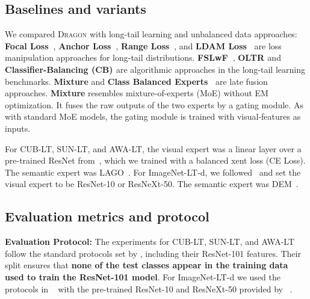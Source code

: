 \documentclass[10pt,twocolumn,letterpaper]{article}
\newcommand{\DRAGON}{\textsc{Dragon}}
\begin{document}
\subsection{Baselines and variants}
We compared \DRAGON{} with long-tail learning and unbalanced data approaches: 
\textbf{Focal Loss~\cite{Lin2017FocalLF}}, \textbf{Anchor Loss~\cite{Ryou_2019_ICCV}},
\textbf{Range Loss~\cite{Zhang2017RangeLF}}, and \textbf{LDAM Loss~\cite{cao2019learning}} are loss manipulation approaches for long-tail distributions.
\textbf{FSLwF~\cite{Gidaris2018DynamicFV}}, \textbf{OLTR \cite{openlongtailrecognition}} and \textbf{Classifier-Balancing (CB) \cite{Kang2019DecouplingRA}} are algorithmic approaches in the long-tail learning benchmarks.
\textbf{Mixture} and \textbf{Class Balanced Experts~\cite{sharma2020long}} are late fusion approaches.
\textbf{Mixture} resembles mixture-of-experts (MoE) \cite{MoE_hinton} without EM optimization. It fuses the raw outputs of the two experts by a gating module. As with standard MoE models, the gating module is trained with visual-features as inputs.

For CUB-LT, SUN-LT, and AWA-LT, the visual expert was a linear layer over a pre-trained ResNet from~\cite{xianCVPR,xian_awa2}, which we trained with a balanced xent loss (CE Loss). The semantic expert was LAGO~\cite{LAGO}. For ImageNet-LT-d, we followed~\cite{Kang2019DecouplingRA} and set the visual expert to be ResNet-10 or ResNeXt-50. The semantic expert was DEM~\cite{DEM}.

\subsection{Evaluation metrics and protocol}

\textbf{Evaluation Protocol:}
The experiments for CUB-LT, SUN-LT, and AWA-LT follow the standard protocols set by \cite{Schnfeld2019GeneralizedZL,xianCVPR,xian_awa2}, including their ResNet-101 features.
Their split ensures that \textbf{none of the test classes appear in the training data used to train the ResNet-101 model}. 
For ImageNet-LT-d we used the protocols in ~\cite{openlongtailrecognition,Kang2019DecouplingRA} with the pre-trained ResNet-10 and ResNeXt-50 provided by ~\cite{Kang2019DecouplingRA}. 
\end{document}
